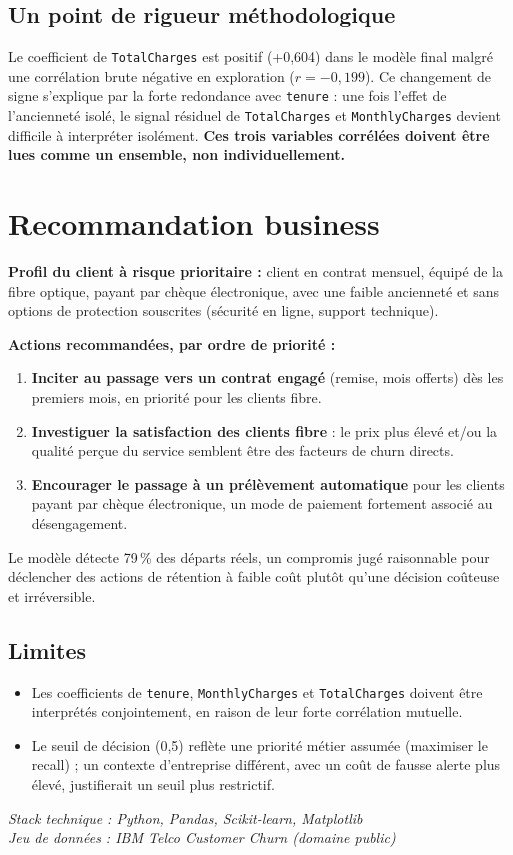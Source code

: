 \documentclass[11pt,a4paper]{article}
\newcommand{\keyfact}[1]{%
  \begin{center}
  \colorbox{blue!8}{\parbox{0.92\linewidth}{\vspace{4pt}#1\vspace{4pt}}}
  \end{center}
}
\begin{document}
\subsection{Un point de rigueur méthodologique}
Le coefficient de \texttt{TotalCharges} est positif (+0,604) dans le modèle final malgré une corrélation brute négative en exploration ($r=-0{,}199$). Ce changement de signe s'explique par la forte redondance avec \texttt{tenure} : une fois l'effet de l'ancienneté isolé, le signal résiduel de \texttt{TotalCharges} et \texttt{MonthlyCharges} devient difficile à interpréter isolément. \textbf{Ces trois variables corrélées doivent être lues comme un ensemble, non individuellement.}

\section{Recommandation business}

\keyfact{\textbf{Profil du client à risque prioritaire :} client en contrat mensuel, équipé de la fibre optique, payant par chèque électronique, avec une faible ancienneté et sans options de protection souscrites (sécurité en ligne, support technique).}

\textbf{Actions recommandées, par ordre de priorité :}
\begin{enumerate}[label=\arabic*.]
\item \textbf{Inciter au passage vers un contrat engagé} (remise, mois offerts) dès les premiers mois, en priorité pour les clients fibre.
\item \textbf{Investiguer la satisfaction des clients fibre} : le prix plus élevé et/ou la qualité perçue du service semblent être des facteurs de churn directs.
\item \textbf{Encourager le passage à un prélèvement automatique} pour les clients payant par chèque électronique, un mode de paiement fortement associé au désengagement.
\end{enumerate}

Le modèle détecte 79\,\% des départs réels, un compromis jugé raisonnable pour déclencher des actions de rétention à faible coût plutôt qu'une décision coûteuse et irréversible.

\subsection{Limites}
\begin{itemize}
\item Les coefficients de \texttt{tenure}, \texttt{MonthlyCharges} et \texttt{TotalCharges} doivent être interprétés conjointement, en raison de leur forte corrélation mutuelle.
\item Le seuil de décision (0,5) reflète une priorité métier assumée (maximiser le recall) ; un contexte d'entreprise différent, avec un coût de fausse alerte plus élevé, justifierait un seuil plus restrictif.
\end{itemize}

\vspace{20pt}
\begin{center}
\textit{Stack technique : Python, Pandas, Scikit-learn, Matplotlib}\\
\textit{Jeu de données : IBM Telco Customer Churn (domaine public)}
\end{center}
\end{document}
